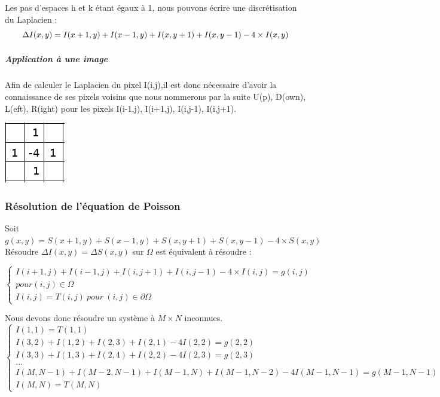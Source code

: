 Les pas d'espaces h et k étant égaux à 1, nous pouvons écrire une discrétisation du Laplacien  :
\begin{equation*}
     \Delta I(x,y) =  I(x+1,y) + I(x-1,y)+ I(x,y+1) + I(x,y-1) - 4\times I(x,y)  \\
\end{equation*}

\subparagraph{Application à une image }
Afin de calculer le Laplacien du pixel I(i,j),il est donc nécessaire d'avoir la connaissance de ses pixels voisins que nous nommerons par la suite U(p), D(own), L(eft), R(ight) pour les pixels I(i-1,j), I(i+1,j), I(i,j-1), I(i,j+1). 

\begin{center}
    \includegraphics[scale = 0.8]{Images/Laplacian.png}
\end{center}

\subsubsection{Résolution de l'équation de Poisson} 
Soit $g(x,y) = S(x+1,y) + S(x-1,y)+ S(x,y+1) + S(x,y-1) - 			4\times S(x,y)$\\
Résoudre $\Delta I(x,y) = \Delta S(x,y)$ sur $\Omega$ est équivalent à résoudre :\\
\begin{center}
\begin{equation*}
    \left \{
    \begin{aligned}
    I(i+1,j) + I(i-1,j)+ I(i,j+1) + I(i, j-1) - 4\times 			I(i,j)= g(i,j)\\ pour (i,j)\in \Omega \\
    I(i,j) = T(i,j) \ pour \ (i,j) \in \partial \Omega
    \end{aligned}
    \right.
\end{equation*}
\end{center}
Nous devons donc résoudre un système à $M\times N $ inconnues.
\begin{equation}
\left\{
\begin{aligned}
I(1,1) = T(1,1)\\
I(3,2)+I(1,2)+ I(2,3)+I(2,1)-4I(2,2) =g(2,2) \\
I(3,3)+I(1,3)+ I(2,4)+I(2,2)-4I(2,3) =g(2,3)             \\
... \\
I(M,N-1)+I(M-2,N-1)+ I(M-1,N)+I(M-1,N-2)-4I(M-1,N-1) =g(M-1,N-1)\\
I(M, N) = T(M, N)
\end{aligned}
\right.
\end{equation}

